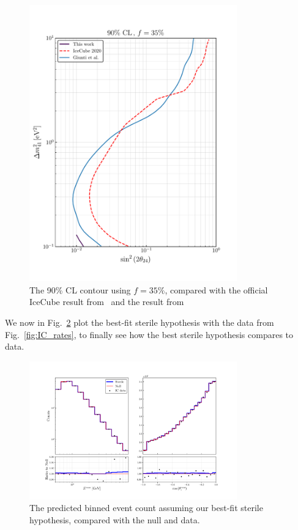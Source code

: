 \begin{figure}
    \centering
    \includegraphics[width=0.8\textwidth]{figures/s24_contour.pdf}
    \caption{The 90\% CL contour using $f=35\%$, compared with the official IceCube result from~\cite{IC2020}
    and the result from~\cite{gariazzoUpdatedGlobalAnalysis2017}}\label{fig:s24_contour}
\end{figure}

We now in Fig.~\ref{fig:final_rate_plot} plot the best-fit sterile hypothesis with the data from Fig.~\ref{fig:IC_rates}, to finally see how the best 
sterile hypothesis compares to data.
\begin{figure}
    \centering
    \includegraphics[width=0.8\textwidth]{figures/final_rate_plot.pdf}
    \caption{The predicted binned event count assuming our best-fit sterile hypothesis, compared with the 
    null and data.}\label{fig:final_rate_plot}
\end{figure}

%